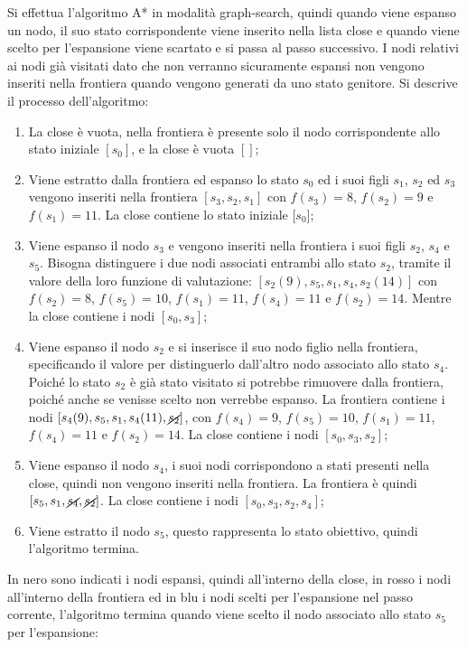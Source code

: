 \documentclass{article}
\numberwithin{equation}{section}
\begin{document}
Si effettua l'algoritmo A* in modalità graph-search, quindi quando viene espanso un nodo, il suo stato corrispondente viene inserito nella lista close e quando viene scelto per l'espansione viene scartato e si passa al passo successivo. I nodi relativi ai nodi già visitati dato che non verranno sicuramente espansi non vengono inseriti nella frontiera quando vengono generati da uno stato genitore. Si descrive il processo dell'algoritmo:
\begin{enumerate}
    \item La close è vuota, nella frontiera è presente solo il nodo corrispondente allo stato iniziale $[s_0]$, e la close è vuota $[]$;
    \item Viene estratto dalla frontiera ed espanso lo stato $s_0$ ed i suoi figli $s_1$, $s_2$ ed $s_3$ vengono inseriti nella frontiera $[s_3,s_2,s_1]$ con $f(s_3)=8$, $f(s_2)=9$ e $f(s_1)=11$. La close contiene lo stato iniziale $[s_0$];
    \item Viene espanso il nodo $s_3$ e vengono inseriti nella frontiera i suoi figli $s_2$, $s_4$ e $s_5$. Bisogna distinguere i due nodi associati entrambi allo stato $s_2$, tramite il valore della loro funzione di valutazione: $[s_2(9),s_5,s_1,s_4,s_2(14)]$ con $f(s_2)=8$, $f(s_5)=10$, $f(s_1)=11$, $f(s_4)=11$ e $f(s_2)=14$. Mentre la close contiene i nodi $[s_0,s_3]$;
    \item Viene espanso il nodo $s_2$ e si inserisce il suo nodo figlio nella frontiera, specificando il valore per distinguerlo dall'altro nodo associato allo stato $s_4$. Poiché lo stato $s_2$ è già stato visitato si potrebbe rimuovere dalla frontiera, poiché anche se venisse scelto non verrebbe espanso. La frontiera contiene i nodi $[s_4(9),s_5,s_1,s_4(11),\cancel{s_2}]$, con $f(s_4)=9$, $f(s_5)=10$, $f(s_1)=11$, $f(s_4)=11$ e $f(s_2)=14$. La close contiene i nodi $[s_0,s_3,s_2]$;
    \item Viene espanso il nodo $s_4$, i suoi nodi corrispondono a stati presenti nella close, quindi non vengono inseriti nella frontiera. La frontiera è quindi $[s_5,s_1,\cancel{s_4},\cancel{s_2}]$. La close contiene i nodi $[s_0,s_3,s_2,s_4]$;
    \item Viene estratto il nodo $s_5$, questo rappresenta lo stato obiettivo, quindi l'algoritmo termina. 
\end{enumerate}

In nero sono indicati i nodi espansi, quindi all'interno della close, in rosso i nodi all'interno della frontiera ed in blu i nodi scelti per l'espansione nel passo corrente, l'algoritmo termina quando viene scelto il nodo associato allo stato $s_5$ per l'espansione:
\end{document}

